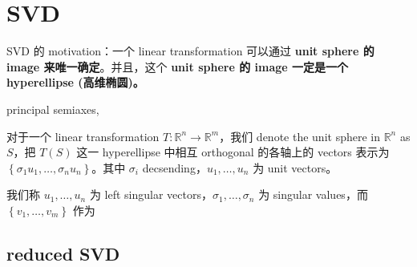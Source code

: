 \chapter{SVD}

SVD 的 motivation：一个 linear transformation 可以通过 \textbf{unit sphere 的 image 来唯一确定}。并且，这个 \textbf{unit sphere 的 image 一定是一个 hyperellipse (高维椭圆)。}

\begin{definition}{principal semiaxes, }

对于一个 linear transformation \(T:\mathbb{R}^{n}\rightarrow\mathbb{R}^{m}\)，我们 denote the unit sphere in \(\mathbb{R}^{n}\) as \(S\)，把 \(T(S)\) 这一 hyperellipse 中相互 orthogonal 的各轴上的 vectors 表示为 \(\left\{ {\sigma_{1}u_{1},\ldots,\sigma_{n}u_{n}} \right\}\)。其中 \(\sigma_{i}\) decsending，\(u_{1},\ldots,u_{n}\) 为 unit vectors。

我们称 \(u_{1},\ldots,u_{n}\) 为 left singular vectors，\(\sigma_{1},\ldots,\sigma_{n}\) 为 singular values，而 \(\left\{ {v_{1},\ldots,v_{m}} \right\}\) 作为

\end{definition}

\section{reduced SVD}

